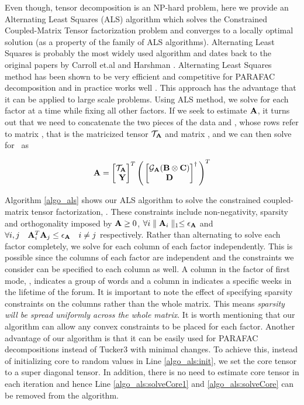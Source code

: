 Even though, tensor decomposition is an NP-hard problem, here we provide an Alternating Least Squares (ALS) algorithm which solves the Constrained Coupled-Matrix Tensor factorization problem and converges to a locally optimal solution (as a property of the family of ALS algorithms).
Alternating Least Squares  is probably the most widely used algorithm and dates
back to the original papers by Carroll et.al \cite{carroll1970analysis} and Harshman \cite{harshman1970foundations}.
Alternating Least Squares method has been shown to be very efficient and competitive for PARAFAC decomposition \cite{tomasi2006comparison} and in practice works well \cite{kolda2009tensor}. 
This approach has the advantage that it can be applied to large scale problems.  Using ALS method,  we solve for each factor at a time while fixing all other factors.  If we seek to estimate ${\mathbf{A}}$, it turns out that we need to concatenate the two pieces of the data \tensor and \sideMatrix, whose rows refer to matrix \factA, that is the matricized tensor ${\mathbf{\mathcal{T}}}_{{\mathbf{A}}}$ and matrix \sideMatrix, and we can then solve for \factA\ as


\begin{equation}\label{eq:coupled2}
{\ensuremath{\mathbf{A}}} 
=
\begin{bmatrix} {\ensuremath{\mathbf{\mathcal{T}}}}_{{\mathbf{A}}}  \\
\ {\mathbf{Y}}
  \end{bmatrix}^{T}
  \Bigg(
  \begin{bmatrix} {\ensuremath{\mathbf{\mathcal{G}}}}_{{\mathbf{A}}}({\mathbf{B}} \otimes {\ensuremath{\mathbf{C}}}) \\
  {\mathbf{D}}
  \end{bmatrix}^{\dagger}
  \Bigg)^{T}
\end{equation}

Algorithm \ref{algo_als} shows our ALS algorithm to solve the constrained coupled-matrix tensor factorization, \ourAlgo.  
These constraints include non-negativity, sparsity and orthogonality imposed by ${\mathbf{A}} \geq 0$, $\forall i \parallel {\ensuremath{\mathbf{A}}}_{i} \parallel_{1} \leq {\ensuremath{\epsilon_{\mathbf{A}}}}$ and  $\forall i, j \quad {\ensuremath{\mathbf{A}}}_{i}^{T} {\mathbf{A}}_{j} \leq {\ensuremath{\epsilon_{\mathbf{A}}}} \quad i \neq j$  respectively. 
Rather than alternating to solve each factor completely, we solve for each column of each factor independently. This is possible since the columns of each factor are independent and the constraints we consider can be specified to each column as well. A column in the factor of first mode, \factA, indicates a group of words and a column in \factB indicates a specific weeks in the lifetime of the forum.  It is important to note the effect of  specifying sparsity constraints on the columns rather than the whole matrix.  This means {\em sparsity will be spread uniformly across the whole matrix}.  
It is worth mentioning that our algorithm can allow any convex constraints to be placed for each factor. 
Another advantage of our algorithm is that it can be easily used for  PARAFAC decompositions instead of Tucker3 with minimal changes. To achieve this, instead of initializing core to random values in Line \ref{algo_als:init}, we set the core tensor to a super diagonal tensor. In addition, there is no need to estimate core tensor in each iteration and hence Line \ref{algo_als:solveCore1} and \ref{algo_als:solveCore} can be removed from the algorithm. 

